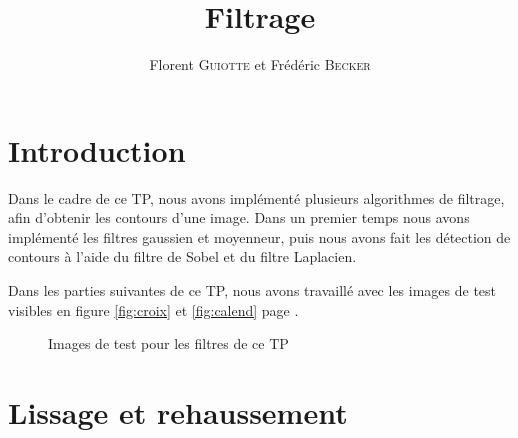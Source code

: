 \documentclass{article}
\author{Florent \textsc{Guiotte} et Frédéric \textsc{Becker}}
\title{Filtrage}
\begin{document}
\maketitle
\tableofcontents

\section{Introduction}

Dans le cadre de ce TP, nous avons implémenté plusieurs algorithmes de filtrage, afin d'obtenir les contours
d'une image. 
Dans un premier temps nous avons implémenté les filtres gaussien et moyenneur, puis nous avons fait les détection
de contours à l'aide du filtre de Sobel et du filtre Laplacien. 

Dans les parties suivantes de ce TP, nous avons travaillé avec les images de test visibles en figure \ref{fig:croix} et
\ref{fig:calend} page \pageref{fig:init}.

\begin{figure}[!ht]%
  \centering
  \hspace{0.030\textwidth}
  \caption{Images de test pour les filtres de ce TP}
  \label{fig:init}
\end{figure}

\section{Lissage et rehaussement}
\end{document}
